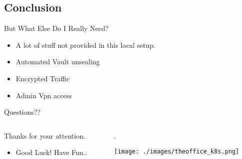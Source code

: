 \documentclass[presentation]{beamer}
\begin{document}
\subsection{Conclusion}
\label{sec:org4c66633}
\begin{frame}[label={sec:org8a1b853}]{But What Else Do I Really Need?}
\begin{itemize}
\item A lot of stuff not provided in this local setup.
\end{itemize}

\begin{theorem}
\begin{itemize}
\item Automated Vault unsealing
\item Encrypted Traffic
\item Admin Vpn access
\end{itemize}
\end{theorem}
\end{frame}

\begin{frame}[label={sec:org187fd7d}]{Questions??}
\begin{columns}
\begin{column}{0.5\columnwidth}
\begin{block}{Thanks for your attention.}
\begin{itemize}
\item Good Luck! Have Fun..
\end{itemize}
\end{block}
\end{column}

\begin{column}{0.5\columnwidth}
\begin{block}{.}
\begin{center}
\texttt{[image: ./images/theoffice\_k8s.png]}
\end{center}
\end{block}
\end{column}
\end{columns}
\end{frame}
\end{document}
